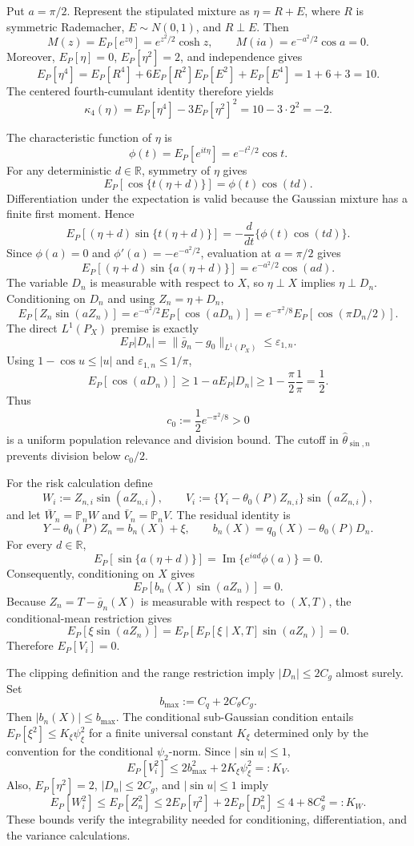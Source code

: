 Put \(a=\pi/2\).  Represent the stipulated mixture as \(\eta=R+E\), where \(R\) is symmetric Rademacher, \(E\sim N(0,1)\), and \(R\perp E\).  Then
\[
M(z)=E_P[e^{z\eta}]=e^{z^2/2}\cosh z,
\qquad
M(ia)=e^{-a^2/2}\cos a=0.
\]
Moreover, \(E_P[\eta]=0\), \(E_P[\eta^2]=2\), and independence gives
\[
E_P[\eta^4]
=E_P[R^4]+6E_P[R^2]E_P[E^2]+E_P[E^4]
=1+6+3=10.
\]
The centered fourth-cumulant identity therefore yields
\[
\kappa_4(\eta)=E_P[\eta^4]-3E_P[\eta^2]^2=10-3\cdot2^2=-2.
\]

The characteristic function of \(\eta\) is
\[
\phi(t)=E_P[e^{it\eta}]=e^{-t^2/2}\cos t.
\]
For any deterministic \(d\in\mathbb R\), symmetry of \(\eta\) gives
\[
E_P[\cos\{t(\eta+d)\}]=\phi(t)\cos(td).
\]
Differentiation under the expectation is valid because the Gaussian mixture has a finite first moment.  Hence
\[
E_P[(\eta+d)\sin\{t(\eta+d)\}]
=-\frac{d}{dt}\{\phi(t)\cos(td)\}.
\]
Since \(\phi(a)=0\) and \(\phi'(a)=-e^{-a^2/2}\), evaluation at \(a=\pi/2\) gives
\[
E_P[(\eta+d)\sin\{a(\eta+d)\}]
=e^{-a^2/2}\cos(ad).
\]
The variable \(D_n\) is measurable with respect to \(X\), so \(\eta\perp X\) implies \(\eta\perp D_n\).  Conditioning on \(D_n\) and using \(Z_n=\eta+D_n\),
\[
E_P[Z_n\sin(aZ_n)]
=e^{-a^2/2}E_P[\cos(aD_n)]
=e^{-\pi^2/8}E_P[\cos(\pi D_n/2)].
\]
The direct \(L^1(P_X)\) premise is exactly
\[
E_P|D_n|=\|\bar g_n-g_0\|_{L^1(P_X)}\le\varepsilon_{1,n}.
\]
Using \(1-\cos u\le |u|\) and \(\varepsilon_{1,n}\le1/\pi\),
\[
E_P[\cos(aD_n)]
\ge1-aE_P|D_n|
\ge1-\frac{\pi}{2}\frac1\pi
=\frac12.
\]
Thus
\[
c_0:=\frac12e^{-\pi^2/8}>0
\]
is a uniform population relevance and division bound.  The cutoff in \(\widehat\theta_{\sin,n}\) prevents division below \(c_0/2\).

For the risk calculation define
\[
W_i:=Z_{n,i}\sin(aZ_{n,i}),
\qquad
V_i:=\{Y_i-\theta_0(P)Z_{n,i}\}\sin(aZ_{n,i}),
\]
and let \(\bar W_n=\mathbb P_nW\) and \(\bar V_n=\mathbb P_nV\).  The residual identity is
\[
Y-\theta_0(P)Z_n=b_n(X)+\xi,
\qquad
b_n(X)=q_0(X)-\theta_0(P)D_n.
\]
For every \(d\in\mathbb R\),
\[
E_P[\sin\{a(\eta+d)\}]
=\operatorname{Im}\{e^{iad}\phi(a)\}=0.
\]
Consequently, conditioning on \(X\) gives
\[
E_P[b_n(X)\sin(aZ_n)]=0.
\]
Because \(Z_n=T-\bar g_n(X)\) is measurable with respect to \((X,T)\), the conditional-mean restriction gives
\[
E_P[\xi\sin(aZ_n)]
=E_P\!\left[E_P[\xi\mid X,T]\sin(aZ_n)\right]=0.
\]
Therefore \(E_P[V_i]=0\).

The clipping definition and the range restriction imply \(|D_n|\le2C_g\) almost surely.  Set
\[
b_{\max}:=C_q+2C_{\theta}C_g.
\]
Then \(|b_n(X)|\le b_{\max}\).  The conditional sub-Gaussian condition entails \(E_P[\xi^2]\le K_{\xi}\psi_{\xi}^2\) for a finite universal constant \(K_{\xi}\) determined only by the convention for the conditional \(\psi_2\)-norm.  Since \(|\sin u|\le1\),
\[
E_P[V_i^2]
\le2b_{\max}^2+2K_{\xi}\psi_{\xi}^2
=:K_V.
\]
Also, \(E_P[\eta^2]=2\), \(|D_n|\le2C_g\), and \(|\sin u|\le1\) imply
\[
E_P[W_i^2]
\le E_P[Z_n^2]
\le2E_P[\eta^2]+2E_P[D_n^2]
\le4+8C_g^2
=:K_W.
\]
These bounds verify the integrability needed for conditioning, differentiation, and the variance calculations.

